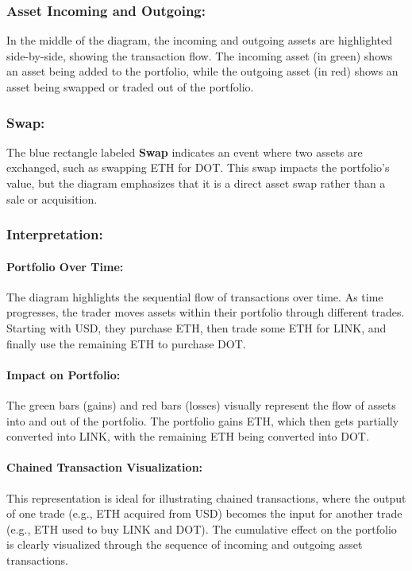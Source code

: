 \documentclass{article}
\begin{document}
\subsubsection*{Asset Incoming and Outgoing:}
In the middle of the diagram, the incoming and outgoing assets are highlighted side-by-side, showing the transaction flow. The incoming asset (in green) shows an asset being added to the portfolio, while the outgoing asset (in red) shows an asset being swapped or traded out of the portfolio.

\subsubsection*{Swap:}
The blue rectangle labeled \textbf{Swap} indicates an event where two assets are exchanged, such as swapping ETH for DOT. This swap impacts the portfolio's value, but the diagram emphasizes that it is a direct asset swap rather than a sale or acquisition.

\subsubsection*{Interpretation:}

\paragraph{Portfolio Over Time:}
The diagram highlights the sequential flow of transactions over time. As time progresses, the trader moves assets within their portfolio through different trades. Starting with USD, they purchase ETH, then trade some ETH for LINK, and finally use the remaining ETH to purchase DOT.

\paragraph{Impact on Portfolio:}
The green bars (gains) and red bars (losses) visually represent the flow of assets into and out of the portfolio. The portfolio gains ETH, which then gets partially converted into LINK, with the remaining ETH being converted into DOT.

\paragraph{Chained Transaction Visualization:}
This representation is ideal for illustrating chained transactions, where the output of one trade (e.g., ETH acquired from USD) becomes the input for another trade (e.g., ETH used to buy LINK and DOT). The cumulative effect on the portfolio is clearly visualized through the sequence of incoming and outgoing asset transactions.
\end{document}
